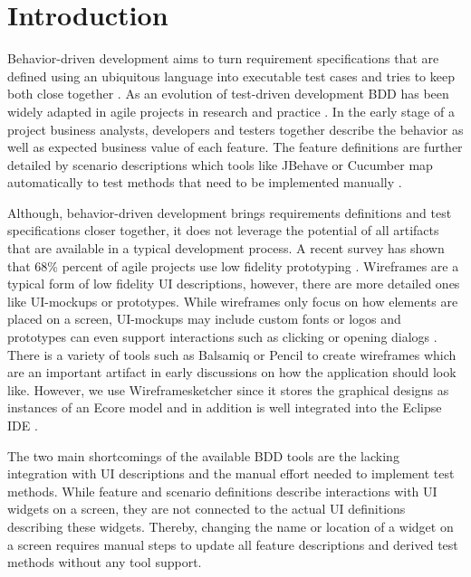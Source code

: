 \documentclass{sig-alternate-05-2015}
\begin{document}
%
%
\printccsdesc



\section{Introduction}
Behavior-driven development aims to turn requirement specifications that are defined using an ubiquitous language into executable test cases and tries to keep both close together \cite{DanNorth}.
As an evolution of test-driven development BDD has been widely adapted in agile projects in research and practice \cite{C.Solis.2011}.
In the early stage of a project business analysts, developers and testers together describe the behavior as well as expected business value of each feature.
The feature definitions are further detailed by scenario descriptions which tools like JBehave or Cucumber map automatically to test methods that need to be implemented manually \cite{wynne2012cucumber}.

Although, behavior-driven development brings requirements definitions and test specifications closer together, it does not leverage the potential of all artifacts that are available in a typical development process.
A recent survey has shown that 68\% percent of agile projects use low fidelity prototyping \cite{Hussain2009}.
Wireframes are a typical form of low fidelity UI descriptions, however, there are more detailed ones like UI-mockups or prototypes.
While wireframes only focus on how elements are placed on a screen, UI-mockups may include custom fonts or logos and prototypes can even support interactions such as clicking or opening dialogs \cite{Coyette2007}. 
There is a variety of tools such as Balsamiq \cite{Balsamiq} or Pencil \cite{Pencil} to create wireframes which are an important artifact in early discussions on how the application should look like.
However, we use Wireframesketcher since it stores the graphical designs as instances of an Ecore model and in addition is well integrated into the Eclipse IDE \cite{Wireframesketcher}.

The two main shortcomings of the available BDD tools are the lacking integration with UI descriptions and the manual effort needed to implement test methods.
While feature and scenario definitions describe interactions with UI widgets on a screen, they are not connected to the actual UI definitions describing these widgets.
Thereby, changing the name or location of a widget on a screen requires manual steps to update all feature descriptions and derived test methods without any tool support.
\end{document}
